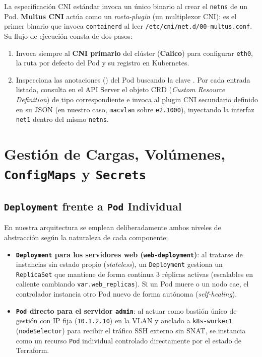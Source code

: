 La especificación CNI estándar invoca un único binario al crear el \texttt{netns} de un Pod. \textbf{Multus CNI} actúa como un \textit{meta-plugin} (un multiplexor CNI): es el primer binario que invoca \texttt{containerd} al leer \texttt{/etc/cni/net.d/00-multus.conf}. Su flujo de ejecución consta de dos pasos:
\begin{enumerate}
  \item Invoca siempre al \textbf{CNI primario} del clúster (\textbf{Calico}) para configurar \texttt{eth0}, la ruta por defecto del Pod y su registro en Kubernetes.
  \item Inspecciona las anotaciones () del Pod buscando la clave . Por cada entrada listada, consulta en el API Server el objeto CRD (\textit{Custom Resource Definition}) de tipo  correspondiente e invoca al plugin CNI secundario definido en su JSON (en nuestro caso, \texttt{macvlan} sobre \texttt{e2.1000}), inyectando la interfaz \texttt{net1} dentro del mismo \texttt{netns}.
\end{enumerate}

\section{Gestión de Cargas, Volúmenes, \texttt{ConfigMaps} y \texttt{Secrets}}

\subsection{\texttt{Deployment} frente a \texttt{Pod} Individual}

En nuestra arquitectura se emplean deliberadamente ambos niveles de abstracción según la naturaleza de cada componente:
\begin{itemize}
  \item \textbf{\texttt{Deployment} para los servidores web (\texttt{web-deployment})}: al tratarse de instancias sin estado propio (\textit{stateless}), un \texttt{Deployment} gestiona un \texttt{ReplicaSet} que mantiene de forma continua 3 réplicas activas (escalables en caliente cambiando \texttt{var.web\_replicas}). Si un Pod muere o un nodo cae, el controlador instancia otro Pod nuevo de forma autónoma (\textit{self-healing}).
  \item \textbf{\texttt{Pod} directo para el servidor \texttt{admin}}: al actuar como bastión único de gestión con IP fija (\texttt{10.1.2.10}) en la VLAN y anclado a \texttt{k8s-worker1} (\texttt{nodeSelector}) para recibir el tráfico SSH externo sin SNAT, se instancia como un recurso \texttt{Pod} individual controlado directamente por el estado de Terraform.
\end{itemize}

